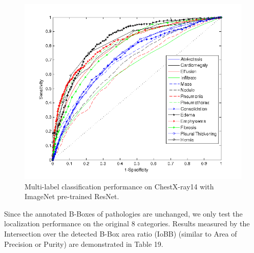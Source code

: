 \documentclass[10pt,twocolumn,letterpaper]{article}
\begin{document}
\begin{figure}[t]
	\centering
	\includegraphics[width=1\linewidth]{resnet_ROC_14.png} 
	\caption{Multi-label classification performance on ChestX-ray14 with ImageNet pre-trained ResNet.}
	\label{fig:ROC_14}
\end{figure}

Since the annotated B-Boxes of pathologies are unchanged, we only test the localization performance on the original 8 categories. Results measured by the Intersection over the detected B-Box area ratio (IoBB) (similar to Area of Precision or Purity) are demonstrated in Table {\color{red} 19}. 
\end{document}
